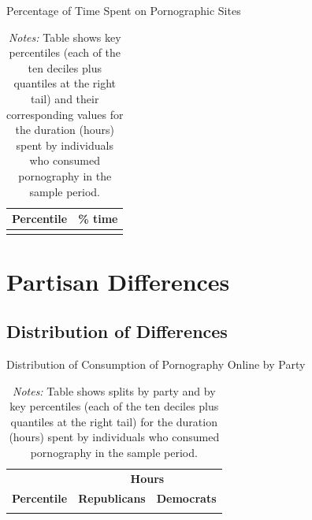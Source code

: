 \documentclass[12pt, letterpaper]{article}
\begin{document}
\begin{table}[ht] \centering \small \setlength\tabcolsep{10 pt}
	\caption{Percentage of Time Spent on Pornographic Sites}
	\label{tab:distribution_prop_duration}
	\begin{adjustbox}{max width=\textwidth}
		\begin{tabular}{cr}
			\toprule
			\multicolumn{1}{c}{\textbf{Percentile}}&\multicolumn{1}{c}{\textbf{\% time}}\\
			\midrule
			\\
			\bottomrule
		\end{tabular}
	\end{adjustbox}
	\caption*{\footnotesize \emph{Notes:} 
		Table shows key percentiles (each of the ten deciles plus quantiles at the right tail) and their corresponding values for the duration (hours) spent by individuals who consumed pornography in the sample period. 
	}
\end{table}

\FloatBarrier
\section{Partisan Differences}
\subsection{Distribution of Differences}
\begin{table}[ht] \centering \small \setlength\tabcolsep{10 pt}
	\caption{Distribution of Consumption of Pornography Online by Party}
	\label{tab:distribution_duration_party}
	\begin{adjustbox}{max width=\textwidth}
		\begin{tabular}{crr}
			\toprule
			\multicolumn{1}{l}{\textbf{}}&\multicolumn{2}{c}{\textbf{Hours}}\\
			\cmidrule(l){2-3}
			\multicolumn{1}{l}{\textbf{Percentile}}&\multicolumn{1}{c}{\textbf{Republicans}}&\multicolumn{1}{c}{\textbf{Democrats}}\\
			\midrule
			\\
			\bottomrule
		\end{tabular}
	\end{adjustbox}
	\caption*{\footnotesize \emph{Notes:} 
		Table shows splits by party and by key percentiles (each of the ten deciles plus quantiles at the right tail) for the duration (hours) spent by individuals who consumed pornography in the sample period. 
	}
\end{table}
\end{document}
